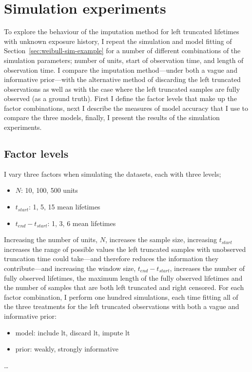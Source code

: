 \section{Simulation experiments}

To explore the behaviour of the imputation method for left truncated lifetimes with unknown exposure history, I repeat the simulation and model fitting of Section~\ref{sec:weibull-sim-example} for a number of different combinations of the simulation parameters; number of units, start of observation time, and length of observation time. I compare the imputation method---under both a vague and informative prior---with the alternative method of discarding the left truncated observations as well as with the case where the left truncated samples are fully observed (as a ground truth). First I define the factor levels that make up the factor combinations, next I describe the measures of model accuracy that I use to compare the three models, finally, I present the results of the simulation experiments.

\subsection{Factor levels}

I vary three factors when simulating the datasets, each with three levels;
\begin{itemize}
    \item $N$: 10, 100, 500 units
    \item $t_{start}$: 1, 5, 15 mean lifetimes
    \item $t_{end} - t_{start}$: 1, 3, 6 mean lifetimes
\end{itemize}
Increasing the number of units, $N$, increases the sample size, increasing $t_{start}$ increases the range of possible values the left truncated samples with unobserved truncation time could take---and therefore reduces the information they contribute---and increasing the window size, $t_{end} - t_{start}$, increases the number of fully observed lifetimes, the maximum length of the fully observed lifetimes and the number of samples that are both left truncated and right censored. For each factor combination, I perform one hundred simulations, each time fitting all of the three treatments for the left truncated observations with both a vague and informative prior:
\begin{itemize}
    \item model: include lt, discard lt, impute lt
    \item prior: weakly, strongly informative
\end{itemize}
\ldots

